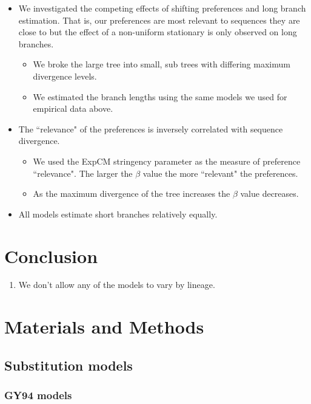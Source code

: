 \documentclass[11pt]{article}
\begin{document}
\begin{itemize}
\item We investigated the competing effects of shifting preferences and long branch estimation. That is, our preferences are most relevant to sequences they are close to but the effect of a non-uniform stationary is only observed on long branches. 
\begin{itemize}
\item We broke the large tree into small, sub trees with differing maximum divergence levels. 
\item We estimated the branch lengths using the same models we used for empirical data above. 
\end{itemize}
\item The ``relevance" of the preferences is inversely correlated with sequence divergence. 
\begin{itemize}
\item We used the ExpCM stringency parameter as the measure of preference ``relevance". The larger the $\beta$ value the more ``relevant" the preferences. 
\item As the maximum divergence of the tree increases the $\beta$ value decreases. 
\end{itemize}
\item All models estimate short branches relatively equally. 

\end{itemize}

\section*{Conclusion}

\begin{enumerate}
  \item We don't allow any of the models to vary by lineage. 
\end{enumerate}

\newpage
\section*{Materials and Methods}

\subsection*{Substitution models}
\subsubsection*{GY94 models}
\end{document}
